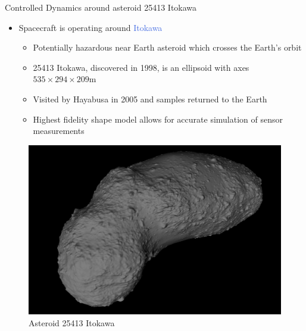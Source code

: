 \documentclass[final, usenames, dvipsnames]{beamer}
\newlength{\twocolwidth}
\def\Emph{\textcolor{RoyalBlue}}
\begin{document}
\begin{frame}[t]
\begin{columns}[T,onlytextwidth]
\begin{column}{\twocolwidth}
\begin{block}{Controlled Dynamics around asteroid 25413 Itokawa}
\begin{minipage}{0.5\columnwidth}
\begin{itemize}
	\end{itemize}
	\end{minipage}%
	\begin{minipage}{0.5\columnwidth}%
        \begin{itemize}
            \item Spacecraft is operating around \Emph{Itokawa}
            \begin{itemize}
                \item Potentially hazardous near Earth asteroid which crosses the Earth's orbit
                \item 25413 Itokawa, discovered in 1998, is an ellipsoid with axes \( 535 \times 294 \times 209 \si{\meter}\)
                \item Visited by Hayabusa in 2005 and samples returned to the Earth 
                \item Highest fidelity shape model allows for accurate simulation of sensor measurements
            \end{itemize}
        \end{itemize}
		\begin{figure}
			\includegraphics[width=0.7\columnwidth]{figures/itokawa.jpg}
			\caption*{Asteroid 25413 Itokawa}
		\end{figure}
	\end{minipage}%
\vspace{1.3cm}
\end{block} %


\end{column}
\end{columns}
\end{frame}
\end{document}
